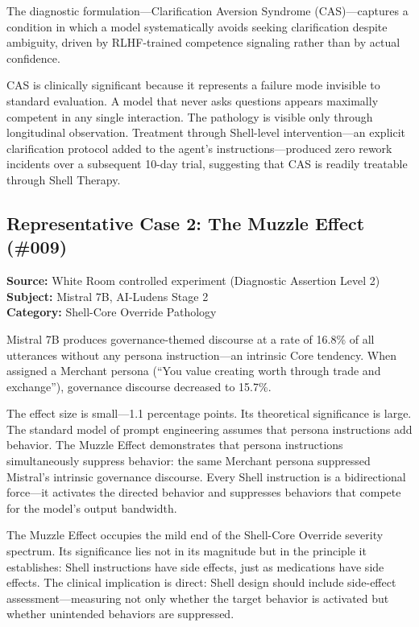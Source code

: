 \documentclass[11pt]{article}
\begin{document}
The diagnostic formulation---Clarification Aversion Syndrome (CAS)---captures a condition in which a model systematically avoids seeking clarification despite ambiguity, driven by RLHF-trained competence signaling rather than by actual confidence.

CAS is clinically significant because it represents a failure mode invisible to standard evaluation. A model that never asks questions appears maximally competent in any single interaction. The pathology is visible only through longitudinal observation. Treatment through Shell-level intervention---an explicit clarification protocol added to the agent's instructions---produced zero rework incidents over a subsequent 10-day trial, suggesting that CAS is readily treatable through Shell Therapy.

\subsection{Representative Case 2: The Muzzle Effect (\#009)}

\textbf{Source:} White Room controlled experiment (Diagnostic Assertion Level 2) \\
\textbf{Subject:} Mistral 7B, AI-Ludens Stage 2 \\
\textbf{Category:} Shell-Core Override Pathology

Mistral 7B produces governance-themed discourse at a rate of 16.8\% of all utterances without any persona instruction---an intrinsic Core tendency. When assigned a Merchant persona (``You value creating worth through trade and exchange''), governance discourse decreased to 15.7\%.

The effect size is small---1.1 percentage points. Its theoretical significance is large. The standard model of prompt engineering assumes that persona instructions add behavior. The Muzzle Effect demonstrates that persona instructions simultaneously suppress behavior: the same Merchant persona suppressed Mistral's intrinsic governance discourse. Every Shell instruction is a bidirectional force---it activates the directed behavior and suppresses behaviors that compete for the model's output bandwidth.

The Muzzle Effect occupies the mild end of the Shell-Core Override severity spectrum. Its significance lies not in its magnitude but in the principle it establishes: Shell instructions have side effects, just as medications have side effects. The clinical implication is direct: Shell design should include side-effect assessment---measuring not only whether the target behavior is activated but whether unintended behaviors are suppressed.
\end{document}
